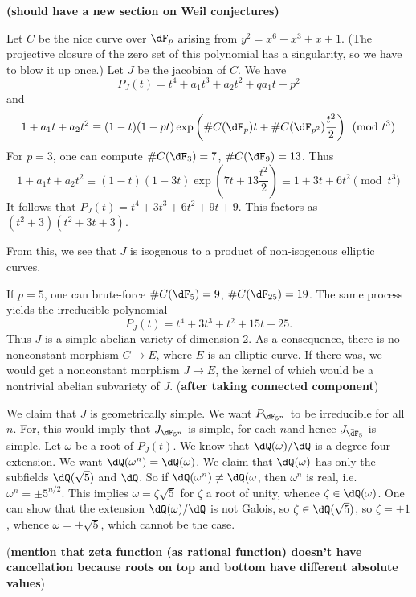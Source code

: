 \documentclass{article}
\begin{document}
\textbf{(should have a new section on Weil conjectures)}

\begin{example}
Let $C$ be the nice curve over $\dF_p$ arising from 
$y^2=x^6-x^3+x+1$. (The projective closure of the zero set of this polynomial 
has a singularity, so we have to blow it up once.) 
Let $J$ be the jacobian of $C$. We have 
\[
  P_J(t) = t^4 + a_1 t^3 + a_2 t^2 + q a_1 t + p^2 
\]
and 
\[
  1+a_1 t + a_2 t^2 \equiv (1-t)(1-p t)\exp\left(\# C(\dF_p)t + \# C(\dF_{p^2}) \frac{t^2}{2}\right) \pmod{t^3}
\]
For $p=3$, one can compute $\# C(\dF_3) = 7$, $\# C(\dF_9) = 13$. Thus 
\[
  1+a_1 t + a_2 t^2 \equiv (1-t)(1-3 t)\exp\left(7 t+13\frac{t^2}{2}\right) \equiv 1+3 t+6 t^2 \pmod{t^3}
\]
It follows that $P_J(t) = t^4+3 t^3+6 t^2 + 9 t+9$. This factors as 
$(t^2+3)(t^2+3 t+3)$. 

From this, we see that $J$ is isogenous to a product of non-isogenous elliptic 
curves. 

If $p=5$, one can brute-force $\# C(\dF_5) = 9$, $\# C(\dF_{25}) = 19$. The 
same process yields the irreducible polynomial 
\[
  P_J(t) = t^4 + 3 t^3 + t^2 + 15 t + 25 \text{.}
\]
Thus $J$ is a simple abelian variety of dimension $2$. As a consequence, there 
is no nonconstant morphism $C\to E$, where $E$ is an elliptic curve. If there 
was, we would get a nonconstant morphism $J\to E$, the kernel of which would be 
a nontrivial abelian subvariety of $J$. (\textbf{after taking connected 
component})

We claim that $J$ is geometrically simple. We want $P_{\dF_{5^n}}$ to be 
irreducible for all $n$. For, this would imply that $J_{\dF_{5^n}}$ is simple, 
for each $n$and hence $J_{\bar\dF_5}$ is simple. Let $\omega$ be a root of 
$P_J(t)$. We know that $\dQ(\omega)/\dQ$ is a degree-four extension. We 
want $\dQ(\omega^n) = \dQ(\omega)$. We claim that 
$\dQ(\omega)$ has only the subfields $\dQ(\sqrt 5)$ and $\dQ$. So if 
$\dQ(\omega^n)\ne\dQ(\omega$, then $\omega^n$ is real, i.e. 
$\omega^n=\pm 5^{n/2}$. This implies $\omega=\zeta\sqrt 5$ for $\zeta$ a 
root of unity, whence $\zeta\in \dQ(\omega)$. One can show that the 
extension $\dQ(\omega)/\dQ$ is not Galois, so 
$\zeta\in \dQ(\sqrt 5)$, so $\zeta=\pm 1$, whence 
$\omega = \pm \sqrt 5$, which cannot be the case. 
\end{example}

(\textbf{mention that zeta function (as rational function) doesn't have 
cancellation because roots on top and bottom have different absolute 
values})















\end{document}
